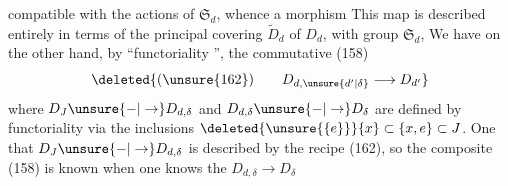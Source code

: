 compatible with the actions of $\mathfrak S_d$, whence a morphism
 This map is described entirely in terms of the principal covering $\widetilde D_d$ of $D_d$, with group $\mathfrak S_d$,  We have on the other hand, by ``functoriality '', the commutative   (158)
\[
\deleted{(\unsure{162})\qquad D_{d,\unsure{d'|\delta}}\longrightarrow D_{d'}}
\]
where $D_J\unsure{-|\to}D_{d,\delta}$ and $D_{d,\delta}\unsure{-|\to}D_\delta$ are defined by functoriality via the inclusions $\deleted{\unsure{\{e\}}}\{x\}\subset\{x,e\}\subset J$. One  that $D_J\unsure{-|\to}D_{d,\delta}$ is described by the recipe (162), so the composite (158) is known when one knows the $D_{d,\delta}\longrightarrow D_\delta$
